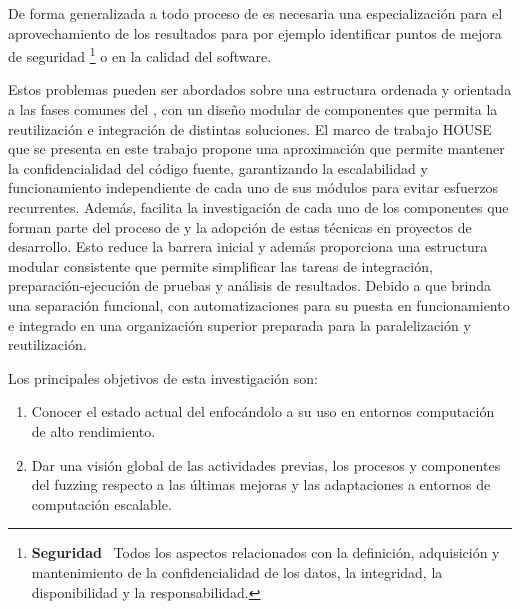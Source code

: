 \documentclass[10pt,conference,a4paper]{IEEEtran}
\begin{document}
De forma generalizada a todo proceso de {\fz} es necesaria una especialización para el aprovechamiento de los resultados para por ejemplo identificar puntos de mejora de seguridad%
\footnote{\textbf{Seguridad}~\cite{ENISA_risk_security_ref}
Todos los aspectos relacionados con la definición, adquisición y mantenimiento de la confidencialidad de los datos, la integridad, la disponibilidad y la responsabilidad.
}%
 o en la calidad del software.

Estos problemas pueden ser abordados sobre una estructura ordenada y orientada a las fases comunes del {\fz}, con un diseño modular de componentes que permita la reutilización e integración de distintas soluciones. El marco de trabajo HOUSE que se presenta en este trabajo propone una aproximación que permite mantener la confidencialidad del código fuente, garantizando la escalabilidad y funcionamiento independiente de cada uno de sus módulos para evitar esfuerzos recurrentes. Además, facilita la investigación de cada uno de los componentes que forman parte del proceso de {\fz} y la adopción de estas técnicas en proyectos de desarrollo. Esto reduce la barrera inicial y además proporciona una estructura modular consistente que permite simplificar las tareas de integración, preparación-ejecución de pruebas y análisis de resultados. Debido a que brinda una separación funcional, con automatizaciones para su puesta en funcionamiento e integrado en una organización superior preparada para la paralelización y reutilización.

Los principales objetivos de esta investigación son:
\begin{enumerate}
    \item Conocer el estado actual del {\fz} enfocándolo a su uso en entornos computación de alto rendimiento.
    \item Dar una visión global de las actividades previas, los procesos y componentes del fuzzing respecto a las últimas mejoras y las adaptaciones a entornos de computación escalable.
\end{enumerate}





\end{document}

